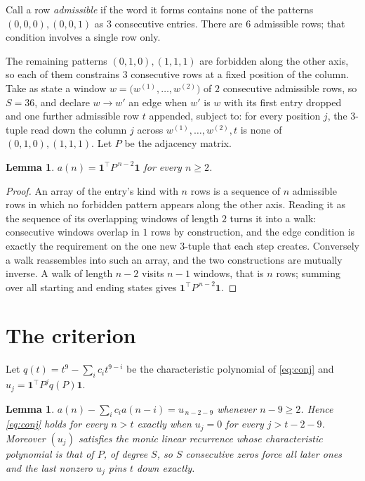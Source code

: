 \documentclass[11pt,a4paper]{article}
\theoremstyle{plain}
\newtheorem{lemma}[theorem]{Lemma}
\theoremstyle{definition}
\begin{document}
Call a row \emph{admissible} if the word it forms contains none of the patterns
$(0,0,0), (0,0,1)$ as $3$ consecutive entries. There are $6$ admissible rows; that condition
involves a single row only.

The remaining patterns $(0,1,0), (1,1,1)$ are forbidden along the other axis, so each of them
constrains $3$ consecutive rows at a fixed position of the column. Take as state a
window $w=\bigl(w^{(1)},\dots,w^{(2)}\bigr)$ of $2$ consecutive admissible
rows, so $S=36$, and declare $w\to w'$ an edge when $w'$ is $w$ with its first entry
dropped and one further admissible row $t$ appended, subject to: for every position
$j$, the $3$-tuple read down the column $j$ across $w^{(1)},\dots,w^{(2)},t$
is none of $(0,1,0), (1,1,1)$. Let $P$ be the adjacency matrix.

\begin{lemma}\label{lem:walk}
$a(n)=\mathbf{1}^{\!\top}P^{\,n-2}\mathbf{1}$ for every $n\ge2$.
\end{lemma}

\begin{proof}
An array of the entry's kind with $n$ rows is a sequence of $n$ admissible rows in
which no forbidden pattern appears along the other axis. Reading it as the sequence of its
overlapping windows of length $2$ turns it into a walk: consecutive windows overlap in
$1$ rows by construction, and the edge condition is exactly the requirement on the one
new $3$-tuple that each step creates. Conversely a walk reassembles into such an array,
and the two constructions are mutually inverse. A walk of length $n-2$ visits $n-1$
windows, that is $n$ rows; summing over all starting and ending states gives
$\mathbf{1}^{\!\top}P^{\,n-2}\mathbf{1}$.
\end{proof}

\section{The criterion}

Let $q(t)=t^{9}-\sum_i c_i t^{9-i}$ be the characteristic polynomial of
\eqref{eq:conj} and $u_j=\mathbf{1}^{\!\top}P^{j}q(P)\mathbf{1}$.

\begin{lemma}\label{lem:crit}
$a(n)-\sum_i c_i a(n-i)=u_{\,n-2-9}$ whenever $n-9\ge2$. Hence
\eqref{eq:conj} holds for every $n>t$ exactly when $u_j=0$ for every
$j>t-2-9$. Moreover $(u_j)$ satisfies the monic linear recurrence whose
characteristic polynomial is that of $P$, of degree $S$, so $S$ consecutive zeros force all
later ones and the last nonzero $u_j$ pins $t$ down exactly.
\end{lemma}
\end{document}
